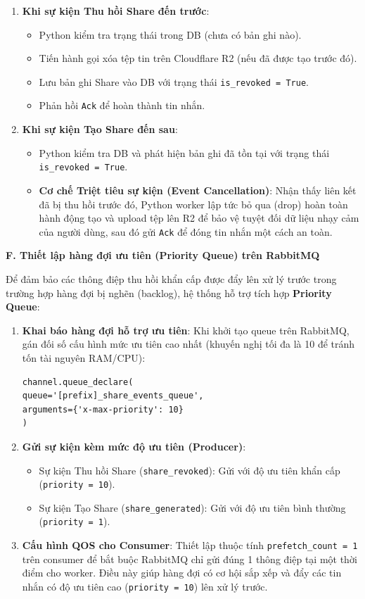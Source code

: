 \begin{enumerate}
\item \textbf{Khi sự kiện Thu hồi Share đến trước}:
\begin{itemize}
\item Python kiểm tra trạng thái trong DB (chưa có bản ghi nào).
\item Tiến hành gọi xóa tệp tin trên Cloudflare R2 (nếu đã được tạo trước đó).
\item Lưu bản ghi Share vào DB với trạng thái \texttt{is\_revoked = True}.
\item Phản hồi \texttt{Ack} để hoàn thành tin nhắn.
\end{itemize}
\item \textbf{Khi sự kiện Tạo Share đến sau}:
\begin{itemize}
\item Python kiểm tra DB và phát hiện bản ghi đã tồn tại với trạng thái \texttt{is\_revoked = True}.
\item \textbf{Cơ chế Triệt tiêu sự kiện (Event Cancellation)}: Nhận thấy liên kết đã bị thu hồi trước đó, Python worker lập tức bỏ qua (drop) hoàn toàn hành động tạo và upload tệp lên R2 để bảo vệ tuyệt đối dữ liệu nhạy cảm của người dùng, sau đó gửi \texttt{Ack} để đóng tin nhắn một cách an toàn.
\end{itemize}
\end{enumerate}

\textbf{F. Thiết lập hàng đợi ưu tiên (Priority Queue) trên RabbitMQ}

Để đảm bảo các thông điệp thu hồi khẩn cấp được đẩy lên xử lý trước trong trường hợp hàng đợi bị nghẽn (backlog), hệ thống hỗ trợ tích hợp \textbf{Priority Queue}:
\begin{enumerate}
\item \textbf{Khai báo hàng đợi hỗ trợ ưu tiên}: Khi khởi tạo queue trên RabbitMQ, gán đối số cấu hình mức ưu tiên cao nhất (khuyến nghị tối đa là 10 để tránh tốn tài nguyên RAM/CPU):
\begin{verbatim}
channel.queue_declare(
queue='[prefix]_share_events_queue',
arguments={'x-max-priority': 10}
)
\end{verbatim}
\item \textbf{Gửi sự kiện kèm mức độ ưu tiên (Producer)}:
\begin{itemize}
\item Sự kiện Thu hồi Share (\texttt{share\_revoked}): Gửi với độ ưu tiên khẩn cấp (\texttt{priority = 10}).
\item Sự kiện Tạo Share (\texttt{share\_generated}): Gửi với độ ưu tiên bình thường (\texttt{priority = 1}).
\end{itemize}
\item \textbf{Cấu hình QOS cho Consumer}: Thiết lập thuộc tính \texttt{prefetch\_count = 1} trên consumer để bắt buộc RabbitMQ chỉ gửi đúng 1 thông điệp tại một thời điểm cho worker. Điều này giúp hàng đợi có cơ hội sắp xếp và đẩy các tin nhắn có độ ưu tiên cao (\texttt{priority = 10}) lên xử lý trước.
\end{enumerate}

